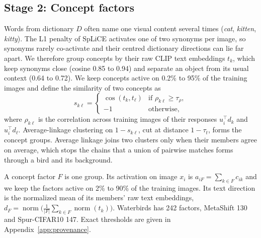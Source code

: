 \documentclass{article}
\begin{document}
\subsection{Stage 2: Concept factors}
Words from dictionary $D$ often name one visual content several times (\emph{cat}, \emph{kitten}, \emph{kitty}). The L1 penalty of SpLiCE activates one of two synonyms per image, so synonyms rarely co-activate and their centred dictionary directions can lie far apart. We therefore group concepts by their raw CLIP text embeddings $t_k$, which keep synonyms close (cosine 0.85 to 0.94) and separate an object from its usual context (0.64 to 0.72). We keep concepts active on 0.2\% to 95\% of the training images and define the similarity of two concepts as
\begin{equation}
 s_{k\ell}=
 \begin{cases}
 \cos(t_k,t_\ell) & \text{if } \rho_{k\ell}\geq\tau_\rho,\\
 -1 & \text{otherwise,}
 \end{cases}
\end{equation}
where $\rho_{k\ell}$ is the correlation across training images of their responses $u_i^\top d_k$ and $u_i^\top d_\ell$. Average-linkage clustering on $1-s_{k\ell}$, cut at distance $1-\tau_t$, forms the concept groups. Average linkage joins two clusters only when their members agree on average, which stops the chains that a union of pairwise matches forms through a bird and its background.

A concept factor $F$ is one group. Its activation on image $x_i$ is $a_{iF}=\sum_{k\in F}c_{ik}$ and we keep the factors active on 2\% to 90\% of the training images. Its text direction is the normalized mean of its members' raw text embeddings, $d_F=\operatorname{norm}\big(\tfrac{1}{|F|}\sum_{k\in F}\operatorname{norm}(t_k)\big)$. Waterbirds has 242 factors, MetaShift 130 and Spur-CIFAR10 147. Exact thresholds are given in Appendix~\ref{app:provenance}.
\end{document}
